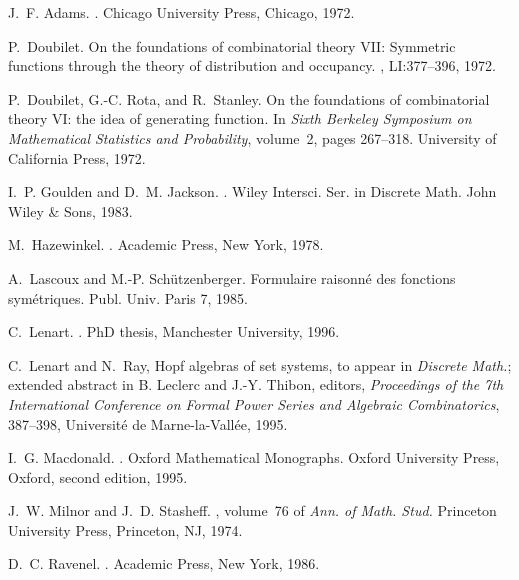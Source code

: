 \documentclass[a4paper,12pt]{amsart}
\theoremstyle{definition}
\numberwithin{equation}{section}
\begin{document}
\begin{thebibliography}{10}

J.~F. Adams.
.
\newblock Chicago University Press, Chicago, 1972.

P.~Doubilet.
\newblock On the foundations of combinatorial theory \mbox{VII}: Symmetric
  functions through the theory of distribution and occupancy.
, LI:377--396, 1972.

P.~Doubilet, G.-C. Rota, and R.~Stanley.
\newblock On the foundations of combinatorial theory \mbox{VI}: the idea of
  generating function.
\newblock In {\em Sixth Berkeley Symposium on Mathematical Statistics and
  Probability}, volume~2, pages 267--318. University of California Press, 1972.

I.~P. Goulden and D.~M. Jackson.
.
\newblock Wiley Intersci. Ser. in Discrete Math. John Wiley \& Sons, 1983.

M.~Hazewinkel.
.
\newblock Academic Press, New York, 1978.

A.~Lascoux and M.-P. Sch\mbox{\"{u}}tzenberger.
\newblock Formulaire raisonn\mbox{\'e} des fonctions sym\mbox{\'e}triques.
\newblock Publ. \mbox{U}niv. \mbox{P}aris 7, 1985.

C.~Lenart.
.
\newblock PhD thesis, Manchester University, 1996.

 C.~Lenart and N.~Ray, Hopf algebras of set systems, to appear in {\it Discrete Math.}; extended abstract in B. Leclerc and J.-Y. Thibon, editors, {\it Proceedings of the 7th International Conference on Formal Power Series and Algebraic Combinatorics}, 387--398, Universit\'e de Marne-la-Vall\'ee, 1995. 

I.~G. Macdonald.
.
\newblock Oxford Mathematical Monographs. Oxford University Press, Oxford,
  second edition, 1995.

J.~W. Milnor and J.~D. Stasheff.
, volume~76 of {\em Ann. of Math. Stud.}
\newblock Princeton University Press, Princeton, NJ, 1974.

D.~C. Ravenel.
.
\newblock Academic Press, New York, 1986.


\end{thebibliography}
\end{document}
